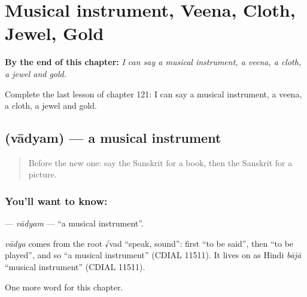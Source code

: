 
\chapter{Musical instrument, Veena, Cloth, Jewel, Gold}
\label{ch:sa-musical-instrument-veena-cloth-jewel-gold}

\begin{chapteropening}
\textbf{By the end of this chapter:} \emph{I can say a musical instrument, a veena, a cloth, a jewel and gold.}

Complete the last lesson of chapter 121: I can say a musical instrument, a veena, a cloth, a jewel and gold.
\end{chapteropening}

\section[\texorpdfstring{\sk{वाद्यम्} (vādyam)}{वाद्यम् (vādyam)}]{ (vādyam) — a musical instrument}

\label{lesson:SA-C121-vadyam}



\begin{quote}
Before the new one: say the Sanskrit for a book, then the Sanskrit for a picture.
\end{quote}

\subsection*{You'll want to know: }
\textbf{} — \emph{vādyam} — \textquotedblleft{}a musical instrument\textquotedblright{}.

\begin{cousinweb}
\emph{vādya} comes from the root √vad \textquotedblleft{}speak, sound\textquotedblright{}: first \textquotedblleft{}to be said\textquotedblright{}, then \textquotedblleft{}to be played\textquotedblright{}, and so \textquotedblleft{}a musical instrument\textquotedblright{} (CDIAL 11511). It lives on as Hindi \emph{bājā} \textquotedblleft{}musical instrument\textquotedblright{} (CDIAL 11511).
\end{cousinweb}

\begin{grammarlens}[title={What you've built}]
One more word for this chapter.
\end{grammarlens}

